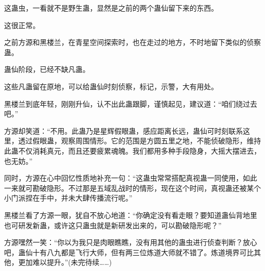 \begin{this_body}
这蛊虫，一看就不是野生蛊，显然是之前的两个蛊仙留下来的东西。

这很正常。

之前方源和黑楼兰，在青星空间探索时，也在走过的地方，不时地留下类似的侦察蛊。

蛊仙阶段，已经不缺凡蛊。

这些凡蛊留在原地，可以给蛊仙时刻侦察，标记，示警，大有用处。

黑楼兰到底年轻，刚刚升仙，认不出此蛊跟脚，谨慎起见，建议道：“咱们绕过去吧。”

方源却笑道：“不用。此蛊乃是星辉假眼蛊，感应距离长远，蛊仙可时刻联系这里，透过假眼蛊，观察周围情形。它的范围是方圆五里之地，不能侦破隐形，维持此蛊不仅消耗真元，而且还要疲累魂魄。我们都用多种手段隐身，大摇大摆进去，也无妨。”

同时，方源在心中回忆性质地补充一句：“这蛊虫常常搭配真视蛊一同使用，如此一来就可勘破隐形。不过那是五域乱战时的情形，现在这个时间，真视蛊还被某个小门派捏在手中，并未大肆传播流行呢。”

黑楼兰看了方源一眼，犹自不放心地道：“你确定没有看走眼？要知道蛊仙背地里也可研发新蛊，或许这只蛊虫就是新研发出来的，可以勘破隐形呢？”

方源嘿然一笑：“你以为我只是肉眼瞧瞧，没有用其他的蛊虫进行侦查判断？放心吧，蛊仙十有八九都是飞行大师，但有两三位炼道大师就不错了。炼道境界可比其他，更加难以提升。”(未完待续……)

\end{this_body}

